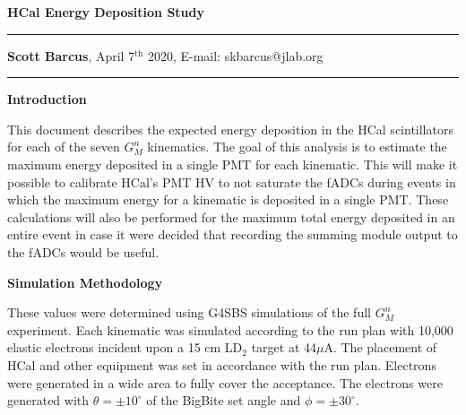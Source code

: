 \documentclass[10pt]{article}
\date{}
\begin{document}
\begin{flushleft}
{\Large
\textbf{HCal Energy Deposition Study}
}
\\
\vspace{4mm}
\hrule height 0.8pt \relax
\vspace{2mm}
\textbf{Scott Barcus}, April 7$^{\text{th}}$ 2020, E-mail: skbarcus@jlab.org
\end{flushleft}
\vspace{-2mm}
\hrule height 0.8pt \relax
\vspace{6mm}

\setlength{\parindent}{0.5cm}


{\large \noindent \bf{Introduction}}
\vspace{3mm}

This document describes the expected energy deposition in the HCal scintillators for each of the seven $G_M^n$ kinematics. The goal of this analysis is to estimate the maximum energy deposited in a single PMT for each kinematic. This will make it possible to calibrate HCal's PMT HV to not saturate the fADCs during events in which the maximum energy for a kinematic is deposited in a single PMT. These calculations will also be performed for the maximum total energy deposited in an entire event in case it were decided that recording the summing module output to the fADCs would be useful.
\vspace{3mm}

{\large \noindent \bf{Simulation Methodology}}
\vspace{3mm}

These values were determined using G4SBS simulations of the full $G_M^n$ experiment. Each kinematic was simulated according to the run plan with 10,000 elastic electrons incident upon a 15 cm LD$_2$ target at 44$\mu$A. The placement of HCal and other equipment was set in accordance with the run plan. Electrons were generated in a wide area to fully cover the acceptance. The electrons were generated with $\theta = \pm10^{\circ}$ of the BigBite set angle and $\phi = \pm30^{\circ}$.
\vspace{3mm}
\end{document}
